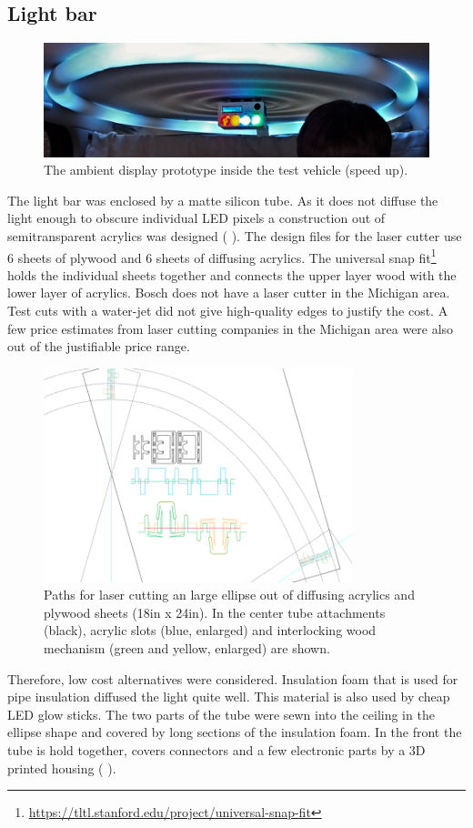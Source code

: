 \subsection{Light bar}
\label{ssec:lightbar}
\begin{figure}
  \includegraphics[width=\textwidth]{fig/teaser.png}
  \caption{The ambient display prototype inside the test vehicle (speed up).}
  \label{fig:ambientdisplay}
\end{figure}
The light bar was enclosed by a matte silicon tube. As it does not diffuse the light enough to obscure individual LED pixels a construction out of semitransparent acrylics was designed ( \emph{}). The design files for the laser cutter use 6 sheets of plywood and 6 sheets of diffusing acrylics. The universal snap fit\footnote{\url{https://tltl.stanford.edu/project/universal-snap-fit}} holds the individual sheets together and connects the upper layer wood with the lower layer of acrylics.  Bosch does not have a laser cutter in the Michigan area. Test cuts with a water-jet did not give high-quality edges to justify the cost. A few price estimates from laser cutting companies in the Michigan area were also out of the justifiable price range. 
\begin{figure}
    \includegraphics[width=0.8\textwidth]{fig/lasercut.png}
    \caption[Paths for Laser Cutting]{Paths for laser cutting an large ellipse out of diffusing acrylics and plywood sheets (18in x 24in). In the center tube attachments (black), acrylic slots (blue,  enlarged) and interlocking wood mechanism (green and yellow, enlarged) are shown.}
    \label{fig:lasercut}
\end{figure}
Therefore, low cost alternatives were considered. Insulation foam that is used for pipe insulation diffused the light quite well. This material is also used by cheap LED glow sticks. The two parts of the tube were sewn into the ceiling in the ellipse shape and covered by long sections of the insulation foam. 
In the front the tube is hold together, covers connectors and a few electronic parts by a 3D printed housing ( \emph{}). 

